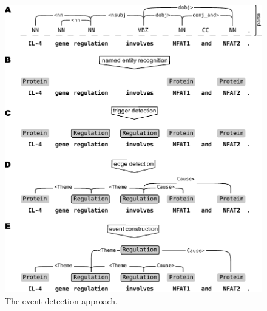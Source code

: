 \documentclass[a4paper,12pt]{article}
\begin{document}
\begin{figure}[htb]
\begin{center}
\includegraphics[scale=0.75]{Figures/model-sentence-pubmed1p.pdf}
\end{center}
\caption{The event detection approach.}
\label{fig-sentence}
\end{figure}
\end{document}
